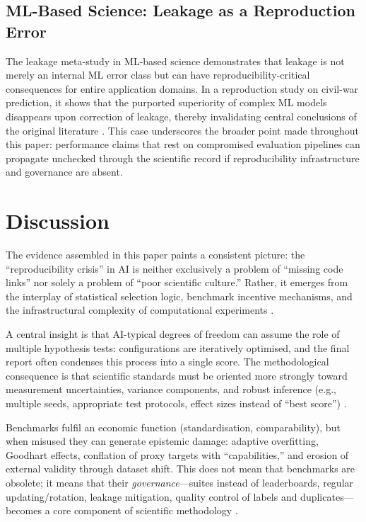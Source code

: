 \documentclass[12pt, a4paper]{article}
\begin{document}
\subsection{ML-Based Science: Leakage as a Reproduction Error}
\label{sec:case_mlscience}

The leakage meta-study in ML-based science demonstrates that leakage is
not merely an internal ML error class but can have
reproducibility-critical consequences for entire application domains.  In
a reproduction study on civil-war prediction, it shows that the
purported superiority of complex ML models disappears upon correction
of leakage, thereby invalidating central conclusions of the original
literature \cite{Kapoor2023}.  This case underscores the broader point
made throughout this paper: performance claims that rest on compromised
evaluation pipelines can propagate unchecked through the scientific
record if reproducibility infrastructure and governance are absent.

\section{Discussion}
\label{sec:discussion}

The evidence assembled in this paper paints a consistent picture: the
``reproducibility crisis'' in AI is neither exclusively a problem of
``missing code links'' nor solely a problem of ``poor scientific
culture.''  Rather, it emerges from the interplay of statistical
selection logic, benchmark incentive mechanisms, and the infrastructural
complexity of computational experiments \cite{Goodman2016,Kapoor2023}.

A central insight is that AI-typical degrees of freedom can assume the
role of multiple hypothesis tests: configurations are iteratively
optimised, and the final report often condenses this process into a
single score.  The methodological consequence is that scientific
standards must be oriented more strongly toward measurement
uncertainties, variance components, and robust inference (e.g., multiple
seeds, appropriate test protocols, effect sizes instead of ``best
score'') \cite{Bouthillier2021,Hagmann2023}.

Benchmarks fulfil an economic function (standardisation,
comparability), but when misused they can generate epistemic damage:
adaptive overfitting, Goodhart effects, conflation of proxy targets with
``capabilities,'' and erosion of external validity through dataset
shift.  This does not mean that benchmarks are obsolete; it means that
their \emph{governance}---suites instead of leaderboards, regular
updating/rotation, leakage mitigation, quality control of labels and
duplicates---becomes a core component of scientific methodology
\cite{Wang2024}.
\end{document}
